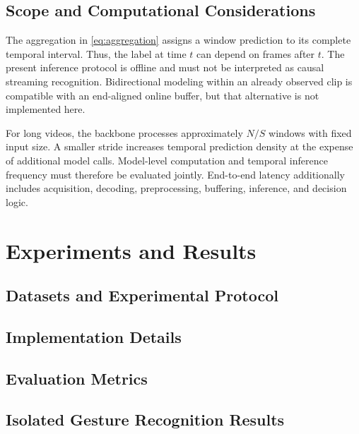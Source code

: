 \documentclass{ieeeaccess}
\begin{document}
\subsection{Scope and Computational Considerations}
\label{sec:scope}
The aggregation in \eqref{eq:aggregation} assigns a window prediction to its complete temporal interval. Thus, the label at time $t$ can depend on frames after $t$. The present inference protocol is offline and must not be interpreted as causal streaming recognition. Bidirectional modeling within an already observed clip is compatible with an end-aligned online buffer, but that alternative is not implemented here.

For long videos, the backbone processes approximately $N/S$ windows with fixed input size. A smaller stride increases temporal prediction density at the expense of additional model calls. Model-level computation and temporal inference frequency must therefore be evaluated jointly. End-to-end latency additionally includes acquisition, decoding, preprocessing, buffering, inference, and decision logic.


\section{Experiments and Results}
\label{sec:experiments}
\subsection{Datasets and Experimental Protocol}
\subsection{Implementation Details}
\subsection{Evaluation Metrics}
\subsection{Isolated Gesture Recognition Results}
\end{document}
